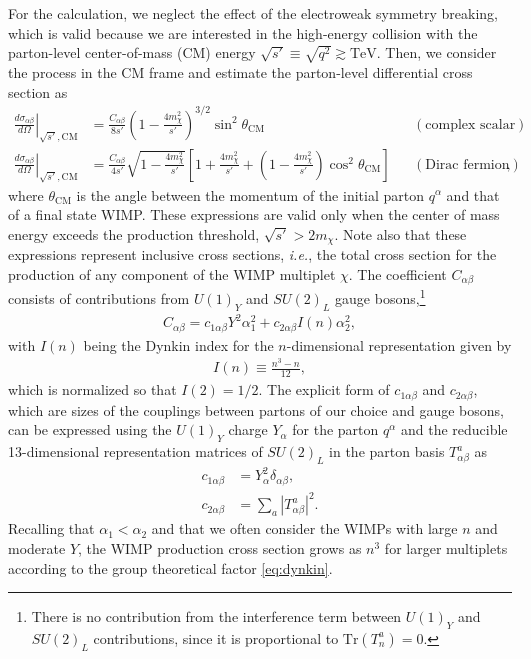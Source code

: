 \documentclass[12pt,twoside,book]{article}
\begin{document}
For the calculation, we neglect the effect of the electroweak symmetry breaking, which is valid because we are interested in the high-energy collision with the parton-level center-of-mass (CM) energy $\sqrt{s'} \equiv \sqrt{q^2} \gtrsim \mathrm{TeV}$.
Then, we consider the process in the CM frame and estimate the parton-level differential cross section as
\begin{align}
  \left. \frac{d \sigma_{\alpha \beta}}{d \Omega} \right|_{\sqrt{s'}, \text{CM}}
  &= \frac{C_{\alpha \beta}}{8 s'} \left( 1 - \frac{4 m_\chi^2}{s'} \right)^{3/2} \sin^2 \theta_{\mathrm{CM}}
  & &(\text{complex scalar}) \label{eq:parton_cross_section_scalar} \\
  \left. \frac{d \sigma_{\alpha \beta}}{d \Omega} \right|_{\sqrt{s'}, \text{CM}}
  &= \frac{C_{\alpha \beta}}{4 s'} \sqrt{1 - \frac{4 m_\chi^2}{s'}}
  \left[ 1 + \frac{4 m_\chi^2}{s'} + \left( 1 - \frac{4 m_\chi^2}{s'} \right) \cos^2 \theta_{\mathrm{CM}} \right]
  & &(\text{Dirac fermion}), \label{eq:parton_cross_section_fermion}
\end{align}
where $\theta_{\mathrm{CM}}$ is the angle between the momentum of the initial parton $q^\alpha$ and that of a final state WIMP.
These expressions are valid only when the center of mass energy exceeds the production threshold, $\sqrt{s'} > 2m_\chi$.
Note also that these expressions represent inclusive cross sections, \textit{i.e.}, the total cross section for the production of any component of the WIMP multiplet $\chi$.
The coefficient $C_{\alpha \beta}$ consists of contributions from $U(1)_Y$ and $SU(2)_L$ gauge bosons,\footnote
{
  There is no contribution from the interference term between $U(1)_Y$ and $SU(2)_L$ contributions, since it is proportional to $\mathrm{Tr} (T^a_n) = 0$.
}
\begin{align}
  C_{\alpha \beta} = c_{1 \alpha \beta} Y^2 \alpha_1^2
  + c_{2 \alpha \beta} I(n) \alpha_2^2,
\end{align}
with $I(n)$ being the Dynkin index for the $n$-dimensional representation given by
\begin{align}
  I(n) \equiv \frac{n^3-n}{12},
  \label{eq:dynkin}
\end{align}
which is normalized so that $I(2) = 1/2$.
The explicit form of $c_{1 \alpha \beta}$ and $c_{2 \alpha \beta}$, which are sizes of the couplings between partons of our choice and gauge bosons, can be expressed using the $U(1)_Y$ charge $Y_\alpha$ for the parton $q^\alpha$ and the reducible 13-dimensional representation matrices of $SU(2)_L$ in the parton basis $T^a_{\alpha \beta}$ as
\begin{align}
  c_{1 \alpha \beta} &= Y_\alpha^2 \delta_{\alpha \beta},\\
  c_{2 \alpha \beta} &= \sum_a \left| T^a_{\alpha \beta} \right|^2.
\end{align}
Recalling that $\alpha_1 < \alpha_2$ and that we often consider the WIMPs with large $n$ and moderate $Y$, the WIMP production cross section grows as $n^3$ for larger multiplets according to the group theoretical factor \eqref{eq:dynkin}.
\end{document}
